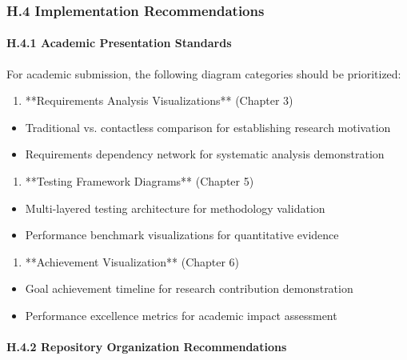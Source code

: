 \documentclass[11pt,a4paper]{article}
\begin{document}
{{\subsubsection{H.4 Implementation Recommendations}

\paragraph{H.4.1 Academic Presentation Standards}

For academic submission, the following diagram categories should be prioritized:

\begin{enumerate}
\item **Requirements Analysis Visualizations** (Chapter 3)
\end{enumerate}
\begin{itemize}
\item Traditional vs. contactless comparison for establishing research motivation
\item Requirements dependency network for systematic analysis demonstration

\end{itemize}
\begin{enumerate}
\item **Testing Framework Diagrams** (Chapter 5)
\end{enumerate}
\begin{itemize}
\item Multi-layered testing architecture for methodology validation
\item Performance benchmark visualizations for quantitative evidence

\end{itemize}
\begin{enumerate}
\item **Achievement Visualization** (Chapter 6)
\end{enumerate}
\begin{itemize}
\item Goal achievement timeline for research contribution demonstration
\item Performance excellence metrics for academic impact assessment

\end{itemize}
\paragraph{H.4.2 Repository Organization Recommendations}

}}
\end{document}
